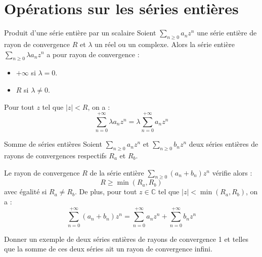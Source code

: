 \documentclass[french,11pt,twoside]{VcCours}
\begin{document}
\begin{Demonstration}{}
\vspace*{ 4cm}
\end{Demonstration}

\section{Opérations sur les séries entières}

\begin{Theoreme}{Produit d'une série entière par un scalaire}
Soient $\sum_{n \geq 0} a_n z^n$ une série entière de rayon de convergence $R$ et $\lambda$ un réel ou un complexe. Alors la série entière $\sum_{n \geq 0} \lambda a_n z^n$ a pour rayon de convergence  :
\begin{itemize}
\item $+ \infty$ si $\lambda =0$.
\item $R$ si $\lambda \neq 0$.
\end{itemize}
Pour tout $z$ tel que $\vert z \vert < R$, on a :
$$ \sum_{n = 0}^{+ \infty} \lambda a_n z^n = \lambda \sum_{n = 0}^{+ \infty} a_n z^n $$
\end{Theoreme}




\begin{Theoreme}{Somme de séries entières}
Soient $\sum_{n \geq 0} a_n z^n$ et $\sum_{n \geq 0} b_n z^n$ deux séries entières de rayons de convergences respectifs $R_a$ et $R_b$.

Le rayon de convergence $R$ de la série entière $\sum_{n \geq 0} (a_n+b_n) z^n$ vérifie alors :
$$ R \geq \min(R_a,R_b)$$
avec égalité si $R_a \neq R_b$. De plus, pour tout $z \in \mathbb{C}$ tel que $\vert z \vert < \min(R_a, R_b)$, on a :
$$ \sum_{n = 0}^{+ \infty} (a_n +b_n) z^n =  \sum_{n = 0}^{+ \infty} a_n z^n +  \sum_{n = 0}^{+ \infty} b_n z^n$$
\end{Theoreme}

\begin{Demonstration}{}

\vspace*{ 3.5cm}
\end{Demonstration}

\newpage

\phantom{test}

\vspace*{ 3.5cm}

\begin{ApplicationDirecte}{} Donner un exemple de deux séries entières de rayons de convergence 1 et telles que la somme de ces deux séries ait un rayon de convergence infini.
\end{ApplicationDirecte}
\end{document}
